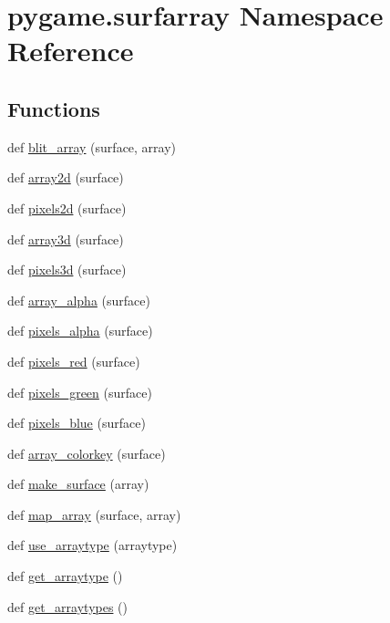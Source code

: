 \hypertarget{namespacepygame_1_1surfarray}{}\section{pygame.\+surfarray Namespace Reference}
\label{namespacepygame_1_1surfarray}
\subsection*{Functions}
\begin{DoxyCompactItemize}
\item 
def \hyperlink{namespacepygame_1_1surfarray_aeb3d21c3f35ba47c13217999d8c8df60}{blit\+\_\+array} (surface, array)
\item 
def \hyperlink{namespacepygame_1_1surfarray_aa39dd3b2e2b9aa792d63a68ae846a9ca}{array2d} (surface)
\item 
def \hyperlink{namespacepygame_1_1surfarray_af496a129c691b2afc2b7d431efcd121c}{pixels2d} (surface)
\item 
def \hyperlink{namespacepygame_1_1surfarray_acce334677092b915a64a591d4caa9b5b}{array3d} (surface)
\item 
def \hyperlink{namespacepygame_1_1surfarray_afa77b220881cc8c872ad7e38fe3419e8}{pixels3d} (surface)
\item 
def \hyperlink{namespacepygame_1_1surfarray_aa5dbca185d506d6f506808de020b5d33}{array\+\_\+alpha} (surface)
\item 
def \hyperlink{namespacepygame_1_1surfarray_a85328cf7f3ac0726ac48b484c4d2c5fc}{pixels\+\_\+alpha} (surface)
\item 
def \hyperlink{namespacepygame_1_1surfarray_ae7d481531ffdcf4f915a22161ee2d5a5}{pixels\+\_\+red} (surface)
\item 
def \hyperlink{namespacepygame_1_1surfarray_a050d01135afee2f22c3cf0cf2b57007c}{pixels\+\_\+green} (surface)
\item 
def \hyperlink{namespacepygame_1_1surfarray_a3268a46e4e06b19e4b91559cbda57cae}{pixels\+\_\+blue} (surface)
\item 
def \hyperlink{namespacepygame_1_1surfarray_aee02078e9cd8468b52ac8d00c90e056e}{array\+\_\+colorkey} (surface)
\item 
def \hyperlink{namespacepygame_1_1surfarray_a2e4d5099d42534776fd74076d289b250}{make\+\_\+surface} (array)
\item 
def \hyperlink{namespacepygame_1_1surfarray_a8cd10e198513c74ce0100735dc7408a8}{map\+\_\+array} (surface, array)
\item 
def \hyperlink{namespacepygame_1_1surfarray_a01dea8427ceac95151f6535ba151bb6b}{use\+\_\+arraytype} (arraytype)
\item 
def \hyperlink{namespacepygame_1_1surfarray_aedf2dcad61b5808f388b4e81952c048d}{get\+\_\+arraytype} ()
\item 
def \hyperlink{namespacepygame_1_1surfarray_a89e8a065ab841be09f1b694e4035663a}{get\+\_\+arraytypes} ()
\end{DoxyCompactItemize}


